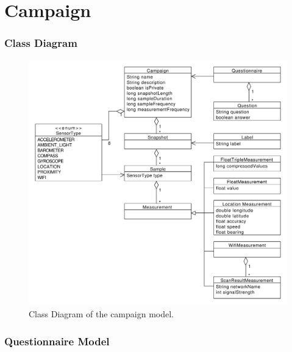 
\section{Campaign}
\label{sec:campaign}


% 


\subsubsection{Class Diagram}

\begin{figure}[!htbp]
    \centering
    \includegraphics[width=\textwidth]{graphic/data_modeling/model_class_diagram.pdf}
    \caption{Class Diagram of the campaign model.}
    \label{fig:model_class_diagram}
\end{figure}


\subsubsection{Questionnaire Model}

